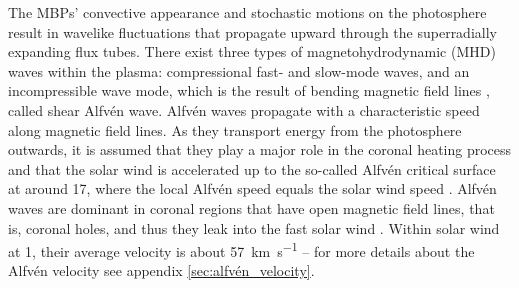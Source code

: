 \begin{figure}[htb]
\end{figure}

The MBPs' convective appearance and stochastic motions on the photosphere result in wavelike fluctuations that propagate upward through the superradially expanding flux tubes. There exist three types of magnetohydrodynamic (MHD) waves within the plasma: compressional fast- and slow-mode waves, and an incompressible wave mode, which is the result of bending magnetic field lines \citep{Alfven1942}, called shear Alfvén wave. Alfvén waves propagate with a characteristic speed along magnetic field lines. As they transport energy from the photosphere outwards, it is assumed that they play a major role in the coronal heating process and that the solar wind is accelerated up to the so-called Alfvén critical surface at around \SI{17}{\Rs}, where the local Alfvén speed equals the solar wind speed \citep{Sittler1999,Exarhos2000}. Alfvén waves are dominant in coronal regions that have open magnetic field lines, that is, coronal holes, and thus they leak into the fast solar wind \citep{Cranmer2005}. Within solar wind at \SI{1}{\au}, their average velocity is about \SI{57}{\km\per\s} \citep{Veselovsky2010} -- for more details about the Alfvén velocity see appendix \autoref{sec:alfvén_velocity}.


